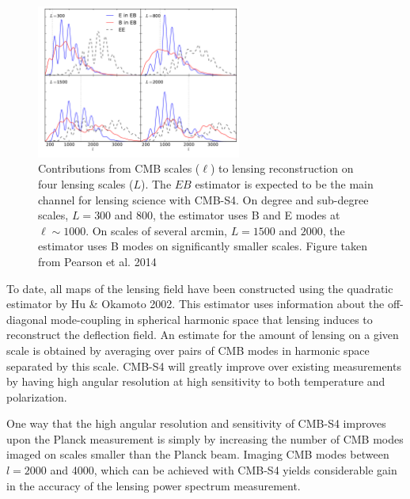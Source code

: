 \begin{figure}[htbp]
\centering
\includegraphics[width=0.60\textwidth]{CMBLensing/signal_contribs.pdf}
\caption{Contributions from CMB scales ($\ell$) to lensing reconstruction on four lensing scales ($L$).  The $EB$ estimator is expected to be the main channel for lensing science with CMB-S4.  On degree and sub-degree scales, $L = 300$ and $800$, the estimator uses B and E modes at $\ell \sim 1000$.  On scales of several arcmin, $L = 1500$ and $2000$, the estimator uses B modes on significantly smaller scales.  Figure taken from Pearson et al. 2014}
\label{sigCon}
\end{figure}

To date, all maps of the lensing field have been constructed using the quadratic estimator by Hu \& Okamoto 2002.  This estimator uses information about the off-diagonal mode-coupling in spherical harmonic space that lensing induces to reconstruct the deflection field.  An estimate for the amount of lensing on a given scale is obtained by averaging over pairs of CMB modes in harmonic space separated by this scale. CMB-S4 will greatly improve over existing
measurements by having high angular resolution at high sensitivity to
both temperature and polarization.

One way that the high angular resolution and sensitivity
of CMB-S4 improves upon the Planck measurement is simply
by increasing the number of CMB modes imaged on scales smaller than the Planck beam.  Imaging CMB modes between $l=2000$ and 4000, which can be achieved with CMB-S4 yields considerable gain in the accuracy of the lensing power spectrum measurement.

